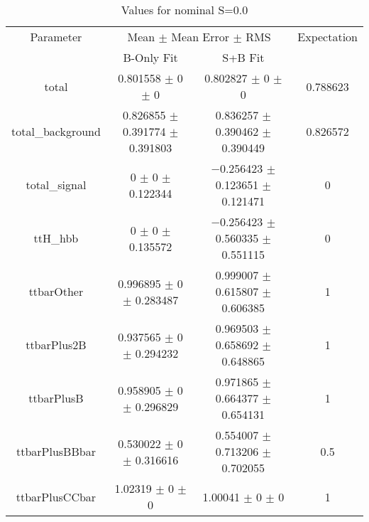 \begin{table}
\centering
\caption{Values for nominal S=0.0}
\begin{tabular}{cccc}
\toprule
Parameter & \multicolumn{2}{c}{Mean $\pm$ Mean Error $\pm$ RMS} & Expectation\\
 & B-Only Fit & S+B Fit & \\
\midrule
total & \num{0.801558} $\pm$ \num{0} $\pm$ \num{0} & \num{0.802827} $\pm$ \num{0} $\pm$ \num{0} & \num{0.788623}\\
total\_background & \num{0.826855} $\pm$ \num{0.391774} $\pm$ \num{0.391803} & \num{0.836257} $\pm$ \num{0.390462} $\pm$ \num{0.390449} & \num{0.826572}\\
total\_signal & \num{0} $\pm$ \num{0} $\pm$ \num{0.122344} & \num{-0.256423} $\pm$ \num{0.123651} $\pm$ \num{0.121471} & \num{0}\\
ttH\_hbb & \num{0} $\pm$ \num{0} $\pm$ \num{0.135572} & \num{-0.256423} $\pm$ \num{0.560335} $\pm$ \num{0.551115} & \num{0}\\
ttbarOther & \num{0.996895} $\pm$ \num{0} $\pm$ \num{0.283487} & \num{0.999007} $\pm$ \num{0.615807} $\pm$ \num{0.606385} & \num{1}\\
ttbarPlus2B & \num{0.937565} $\pm$ \num{0} $\pm$ \num{0.294232} & \num{0.969503} $\pm$ \num{0.658692} $\pm$ \num{0.648865} & \num{1}\\
ttbarPlusB & \num{0.958905} $\pm$ \num{0} $\pm$ \num{0.296829} & \num{0.971865} $\pm$ \num{0.664377} $\pm$ \num{0.654131} & \num{1}\\
ttbarPlusBBbar & \num{0.530022} $\pm$ \num{0} $\pm$ \num{0.316616} & \num{0.554007} $\pm$ \num{0.713206} $\pm$ \num{0.702055} & \num{0.5}\\
ttbarPlusCCbar & \num{1.02319} $\pm$ \num{0} $\pm$ \num{0} & \num{1.00041} $\pm$ \num{0} $\pm$ \num{0} & \num{1}\\
\bottomrule
\end{tabular}
\end{table}